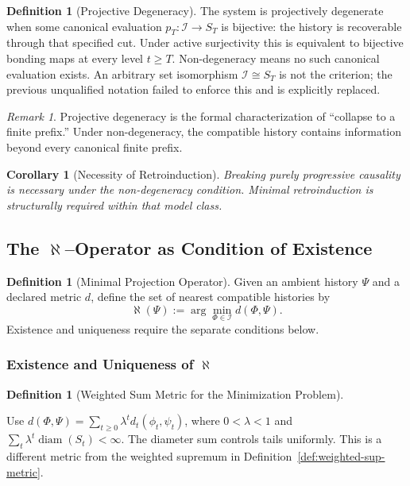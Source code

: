 \documentclass[11pt,a4paper]{article}
\theoremstyle{plain}
\newtheorem{corollary}[theorem]{Corollary}
\theoremstyle{definition}
\newtheorem{definition}[theorem]{Definition}
\theoremstyle{remark}
\newtheorem{remark}[theorem]{Remark}
\begin{document}
\begin{definition}[Projective Degeneracy]\label{def:degeneracy}
The system is projectively degenerate when some canonical evaluation $p_T:\mathcal I\to S_T$ is bijective: the history is recoverable through that specified cut. Under active surjectivity this is equivalent to bijective bonding maps at every level $t\ge T$. Non-degeneracy means no such canonical evaluation exists. An arbitrary set isomorphism $\mathcal I\cong S_T$ is not the criterion; the previous unqualified notation failed to enforce this and is explicitly replaced.
\end{definition}

\begin{remark}
Projective degeneracy is the formal characterization of ``collapse to a finite prefix.'' Under non-degeneracy, the compatible history contains information beyond every canonical finite prefix.
\end{remark}

\begin{corollary}[Necessity of Retroinduction]
Breaking purely progressive causality is necessary under the non-degeneracy condition. Minimal retroinduction is structurally required within that model class.
\end{corollary}

\subsection{\texorpdfstring{The $\aleph$--Operator as Condition of Existence}{The Aleph-Operator as Condition of Existence}}

\begin{definition}[Minimal Projection Operator]
Given an ambient history $\Psi$ and a declared metric $d$, define the set of nearest compatible histories by
\begin{equation}
    \aleph(\Psi) := \arg\min_{\Phi \in \mathcal{I}} d(\Phi, \Psi).
\end{equation}
Existence and uniqueness require the separate conditions below.
\end{definition}

\subsubsection{\texorpdfstring{Existence and Uniqueness of $\aleph$}{Existence and Uniqueness of Aleph}}

\begin{definition}[Weighted Sum Metric for the Minimization Problem]\label{def:weighted-metric}\leavevmode\par
Use $d(\Phi,\Psi)=\sum_{t\geq0}\lambda^t d_t(\phi_t,\psi_t)$, where $0<\lambda<1$ and $\sum_t\lambda^t\operatorname{diam}(S_t)<\infty$. The diameter sum controls tails uniformly. This is a different metric from the weighted supremum in Definition~\ref{def:weighted-sup-metric}.
\end{definition}
\end{document}
